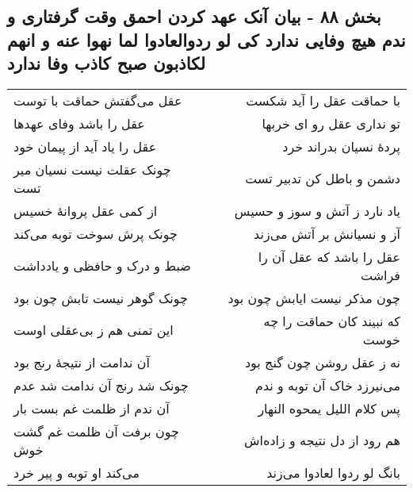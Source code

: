 \begin{center}
\section*{بخش ۸۸ - بیان آنک عهد کردن احمق وقت گرفتاری و ندم هیچ وفایی ندارد کی لو ردوالعادوا لما نهوا عنه و انهم لکاذبون صبح کاذب وفا ندارد}
\label{sec:sh088}
\begin{longtable}{l p{0.5cm} r}
عقل می‌گفتش حماقت با توست
&&
با حماقت عقل را آید شکست
\\
عقل را باشد وفای عهدها
&&
تو نداری عقل رو ای خربها
\\
عقل را یاد آید از پیمان خود
&&
پردهٔ نسیان بدراند خرد
\\
چونک عقلت نیست نسیان میر تست
&&
دشمن و باطل کن تدبیر تست
\\
از کمی عقل پروانهٔ خسیس
&&
یاد نارد ز آتش و سوز و حسیس
\\
چونک پرش سوخت توبه می‌کند
&&
آز و نسیانش بر آتش می‌زند
\\
ضبط و درک و حافظی و یادداشت
&&
عقل را باشد که عقل آن را فراشت
\\
چونک گوهر نیست تابش چون بود
&&
چون مذکر نیست ایابش چون بود
\\
این تمنی هم ز بی‌عقلی اوست
&&
که نبیند کان حماقت را چه خوست
\\
آن ندامت از نتیجهٔ رنج بود
&&
نه ز عقل روشن چون گنج بود
\\
چونک شد رنج آن ندامت شد عدم
&&
می‌نیرزد خاک آن توبه و ندم
\\
آن ندم از ظلمت غم بست بار
&&
پس کلام اللیل یمحوه النهار
\\
چون برفت آن ظلمت غم گشت خوش
&&
هم رود از دل نتیجه و زاده‌اش
\\
می‌کند او توبه و پیر خرد
&&
بانگ لو ردوا لعادوا می‌زند
\\
\end{longtable}
\end{center}
